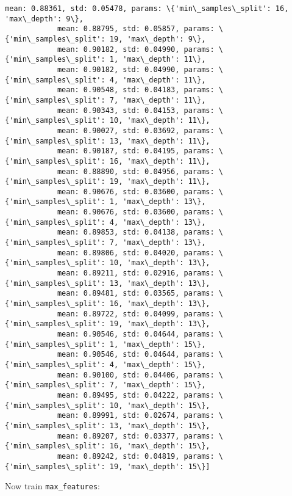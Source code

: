 \documentclass{article}
\begin{document}
\begin{Verbatim}[commandchars=\\\{\}]
            mean: 0.88361, std: 0.05478, params: \{'min\_samples\_split': 16, 'max\_depth': 9\},
            mean: 0.88795, std: 0.05857, params: \{'min\_samples\_split': 19, 'max\_depth': 9\},
            mean: 0.90182, std: 0.04990, params: \{'min\_samples\_split': 1, 'max\_depth': 11\},
            mean: 0.90182, std: 0.04990, params: \{'min\_samples\_split': 4, 'max\_depth': 11\},
            mean: 0.90548, std: 0.04183, params: \{'min\_samples\_split': 7, 'max\_depth': 11\},
            mean: 0.90343, std: 0.04153, params: \{'min\_samples\_split': 10, 'max\_depth': 11\},
            mean: 0.90027, std: 0.03692, params: \{'min\_samples\_split': 13, 'max\_depth': 11\},
            mean: 0.90187, std: 0.04195, params: \{'min\_samples\_split': 16, 'max\_depth': 11\},
            mean: 0.88890, std: 0.04956, params: \{'min\_samples\_split': 19, 'max\_depth': 11\},
            mean: 0.90676, std: 0.03600, params: \{'min\_samples\_split': 1, 'max\_depth': 13\},
            mean: 0.90676, std: 0.03600, params: \{'min\_samples\_split': 4, 'max\_depth': 13\},
            mean: 0.89853, std: 0.04138, params: \{'min\_samples\_split': 7, 'max\_depth': 13\},
            mean: 0.89806, std: 0.04020, params: \{'min\_samples\_split': 10, 'max\_depth': 13\},
            mean: 0.89211, std: 0.02916, params: \{'min\_samples\_split': 13, 'max\_depth': 13\},
            mean: 0.89481, std: 0.03565, params: \{'min\_samples\_split': 16, 'max\_depth': 13\},
            mean: 0.89722, std: 0.04099, params: \{'min\_samples\_split': 19, 'max\_depth': 13\},
            mean: 0.90546, std: 0.04644, params: \{'min\_samples\_split': 1, 'max\_depth': 15\},
            mean: 0.90546, std: 0.04644, params: \{'min\_samples\_split': 4, 'max\_depth': 15\},
            mean: 0.90100, std: 0.04406, params: \{'min\_samples\_split': 7, 'max\_depth': 15\},
            mean: 0.89495, std: 0.04222, params: \{'min\_samples\_split': 10, 'max\_depth': 15\},
            mean: 0.89991, std: 0.02674, params: \{'min\_samples\_split': 13, 'max\_depth': 15\},
            mean: 0.89207, std: 0.03377, params: \{'min\_samples\_split': 16, 'max\_depth': 15\},
            mean: 0.89242, std: 0.04819, params: \{'min\_samples\_split': 19, 'max\_depth': 15\}]
\end{Verbatim}
        
    Now train \texttt{max\_features}:
\end{document}
